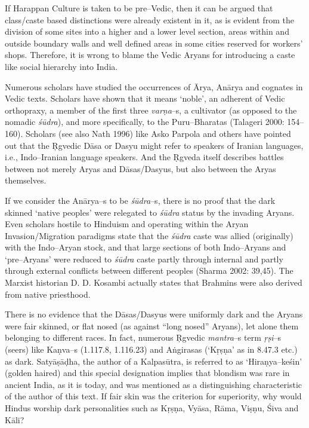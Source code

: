 If Harappan Culture is taken to be pre–Vedic, then it can be argued that class/caste based distinctions were already existent in it, as is evident from the division of some sites into a higher and a lower level section, areas within and outside boundary walls and well defined areas in some cities reserved for workers’ shops. Therefore, it is wrong to blame the Vedic Aryans for introducing a caste like social hierarchy into India.

Numerous scholars have studied the occurrences of Ārya, Anārya and cognates in Vedic texts. Scholars have shown that it means ‘noble’, an adherent of Vedic orthopraxy, a member of the first three \textit{varṇa}–s, a cultivator (as opposed to the nomadic \textit{śūdra}), and more specifically, to the Puru–Bharatas (Talageri 2000: 154–160). Scholars (see also Nath 1996) like Asko Parpola and others have pointed out that the Ṛgvedic Dāsa or Dasyu might refer to speakers of Iranian languages, i.e., Indo–Iranian language speakers. And the Ṛgveda itself describes battles between not merely Aryas and Dāsas/Dasyus, but also between the Aryas themselves.

If we consider the Anārya–s to be \textit{śūdra}–s, there is no proof that the dark skinned ‘native peoples’ were relegated to \textit{śūdra} status by the invading Aryans. Even scholars hostile to Hinduism and operating within the Aryan Invasion/Migration paradigms state that the \textit{śūdra} caste was allied (originally) with the Indo–Aryan stock, and that large sections of both Indo–Aryans and ‘pre–Aryans’ were reduced to \textit{śūdra} caste partly through internal and partly through external conflicts between different peoples (Sharma 2002: 39,45). The Marxist historian D. D. Kosambi actually states that Brahmins were also derived from native priesthood.

There is no evidence that the Dāsas/Dasyus were uniformly dark and the Aryans were fair skinned, or flat nosed (as against “long nosed” Aryans), let alone them belonging to different races. In fact, numerous Ṛgvedic \textit{mantra}–s term \textit{ṛṣi}–s (seers) like Kaṇva–s (1.117.8, 1.116.23) and Aṅgirasas (‘Kṛṣṇa’ as in 8.47.3 etc.) as dark. Satyāṣāḍha, the author of a Kalpasūtra, is referred to as ‘Hiraṇya–keśin’ (golden haired) and this special designation implies that blondism was rare in ancient India, as it is today, and was mentioned as a distinguishing characteristic of the author of this text. If fair skin was the criterion for superiority, why would Hindus worship dark personalities such as Kṛṣṇa, Vyāsa, Rāma, Viṣṇu, Śiva and Kāli?

